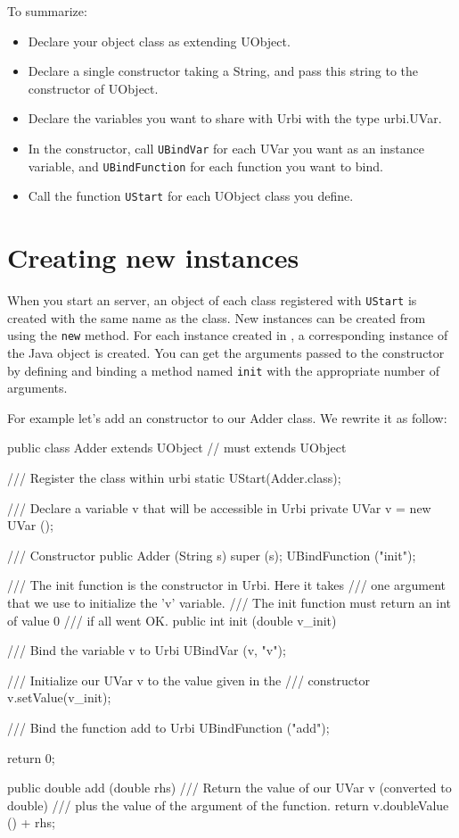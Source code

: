 To summarize:

\begin{itemize}
\item Declare your object class as extending UObject.
\item Declare a single constructor taking a String, and pass this string to
  the constructor of UObject.
\item Declare the variables you want to share with Urbi with the type
  urbi.UVar.
\item In the constructor, call \lstinline{UBindVar} for each UVar you want
  as an instance variable, and \lstinline{UBindFunction} for each function
  you want to bind.
\item Call the function \lstinline{UStart} for each UObject class you
  define.
\end{itemize}

\section{Creating new instances}
\label{sec:uob:apijava:new}

When you start an \urbi server, an object of each class registered with
\lstinline{UStart} is created with the same name as the class. New instances
can be created from \urbi using the \lstinline|new| method. For each
instance created in \urbi, a corresponding instance of the Java object is
created. You can get the arguments passed to the constructor by defining and
binding a method named \lstinline|init| with the appropriate number of
arguments.

For example let's add an \urbi constructor to our Adder class. We rewrite
it as follow:

\begin{java}
public class Adder extends UObject // must extends UObject
{
  /// Register the class within urbi
  static { UStart(Adder.class); }

  /// Declare a variable v that will be accessible in Urbi
  private UVar v = new UVar ();

  /// Constructor
  public Adder (String s)
  {
    super (s);
    UBindFunction ("init");
  }

  /// The init function is the constructor in Urbi. Here it takes
  /// one argument that we use to initialize the 'v' variable.
  /// The init function must return an int of value 0
  /// if all went OK.
  public int init (double v_init)
  {
    /// Bind the variable v to Urbi
    UBindVar (v, "v");

    /// Initialize our UVar v to the value given in the
    /// constructor
    v.setValue(v_init);

    /// Bind the function add to Urbi
    UBindFunction ("add");

    return 0;
  }

  public double add (double rhs)
  {
    /// Return the value of our UVar v (converted to double)
    /// plus the value of the argument of the function.
    return v.doubleValue () + rhs;
  }
}
\end{java}

